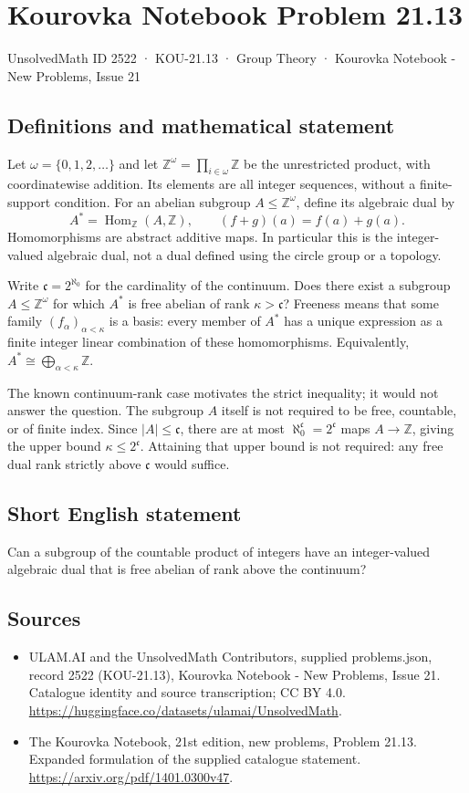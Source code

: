 \documentclass[11pt,a4paper]{article}
\begin{document}
\section*{Kourovka Notebook Problem 21.13}\label{2522}
{\small UnsolvedMath ID 2522 · KOU-21.13 · Group Theory · Kourovka Notebook - New Problems, Issue 21}
\subsection{Definitions and mathematical statement}
Let $\omega=\{0,1,2,\ldots\}$ and let
$\mathbb Z^\omega=\prod_{i\in\omega}\mathbb Z$ be the unrestricted
product, with coordinatewise addition. Its elements are all integer
sequences, without a finite-support condition. For an abelian subgroup
$A\le\mathbb Z^\omega$, define its algebraic dual by
\[
 A^*=\operatorname{Hom}_{\mathbb Z}(A,\mathbb Z),
 \qquad (f+g)(a)=f(a)+g(a).
\]
Homomorphisms are abstract additive maps. In particular this is the
integer-valued algebraic dual, not a dual defined using the circle
group or a topology.

Write $\mathfrak c=2^{\aleph_0}$ for the cardinality of the continuum.
Does there exist a subgroup $A\le\mathbb Z^\omega$ for which $A^*$ is
free abelian of rank $\kappa>\mathfrak c$? Freeness means that some
family $(f_\alpha)_{\alpha<\kappa}$ is a basis: every member of $A^*$
has a unique expression as a finite integer linear combination of
these homomorphisms. Equivalently,
$A^*\cong\bigoplus_{\alpha<\kappa}\mathbb Z$.

The known continuum-rank case motivates the strict inequality; it
would not answer the question. The subgroup $A$ itself is not required
to be free, countable, or of finite index. Since $|A|\le\mathfrak c$,
there are at most $\aleph_0^{\mathfrak c}=2^{\mathfrak c}$ maps
$A\to\mathbb Z$, giving the upper bound
$\kappa\le2^{\mathfrak c}$. Attaining that upper bound is not required:
any free dual rank strictly above $\mathfrak c$ would suffice.
\subsection{Short English statement}
Can a subgroup of the countable product of integers have an integer-valued algebraic dual that is free abelian of rank above the continuum?
\subsection{Sources}
\begin{itemize}
\item[S1] ULAM.AI and the UnsolvedMath Contributors, supplied problems.json, record 2522 (KOU-21.13), Kourovka Notebook - New Problems, Issue 21. Catalogue identity and source transcription; CC BY 4.0.
\url{https://huggingface.co/datasets/ulamai/UnsolvedMath}.
\item[S2] The Kourovka Notebook, 21st edition, new problems, Problem 21.13. Expanded formulation of the supplied catalogue statement.
\url{https://arxiv.org/pdf/1401.0300v47}.
\end{itemize}
\end{document}
